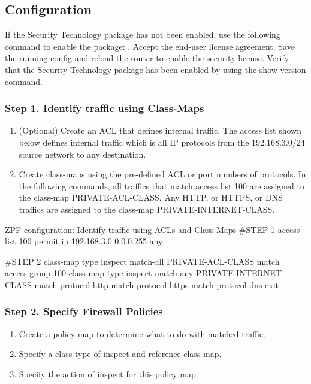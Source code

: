 \subsection{Configuration}

  If the Security Technology package has not been enabled, use the following command to enable the package: .   Accept the end-user license agreement.  Save the running-config and reload the router to enable the security license.  Verify that the Security Technology package has been enabled by using the show version command.

\subsubsection{Step 1. Identify traffic using Class-Maps}

\begin{enumerate}
\item (Optional) Create an ACL that defines internal traffic. The access list shown below defines internal traffic which is  all IP protocols from the 192.168.3.0/24 source network to any destination.
\item Create class-maps using the pre-defined ACL or port numbers of protocols. In the following commands, all traffics that match access list 100 are assigned to the class-map PRIVATE-ACL-CLASS. Any HTTP, or HTTPS, or DNS traffics are assigned to the class-map PRIVATE-INTERNET-CLASS.
\end{enumerate}

\begin{sexylisting}{ZPF configuration: Identify traffic using ACLs and Class-Maps}
#STEP 1
access-list 100 permit ip 192.168.3.0 0.0.0.255 any

#STEP 2
class-map type inspect match-all PRIVATE-ACL-CLASS
  match access-group 100    
class-map type inspect match-any PRIVATE-INTERNET-CLASS
  match protocol http
  match protocol https
  match protocol dns
exit    
\end{sexylisting}

\subsubsection{Step 2. Specify Firewall Policies}

\begin{enumerate}
\item Create a policy map to determine what to do with matched traffic.
\item Specify a class type of inspect and reference class map.
\item Specify the action of inspect for this policy map.
\end{enumerate}

